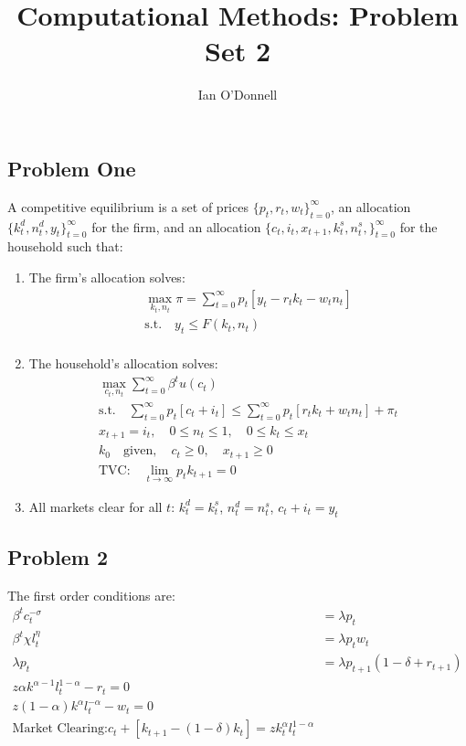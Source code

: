 \documentclass{article}
\title{Computational Methods: Problem Set 2}
\author{Ian O'Donnell}
\date{\vspace{-5ex}}
\begin{document}
\maketitle
\subsection*{Problem One}
A competitive equilibrium is a set of prices $ \{p_t , r_t, w_t\}_{t=0}^\infty $, an allocation $ \{k_t^d, n_t^d, y_t\}_{t=0}^\infty $
for the firm, and an allocation $ \{c_t, i_t, x_{t+1}, k_t^s, n_t^s,\}_{t=0}^\infty $ for the household such that: 
\begin{enumerate}
    \item The firm's allocation solves: 
    \begin{align*}
        \max_{k_t, n_t} \pi = \sum_{t=0}^{\infty} p_t [y_t - r_t k_t - w_t n_t] \\
        \text{s.t.} \quad y_t \leq F(k_t, n_t)\\
    \end{align*}

    \item The household's allocation solves: 
    \begin{gather*}
        \max_{c_t, n_t} \sum_{t=0}^{\infty} \beta^t u(c_t) \\
        \text{s.t.} \quad \sum_{t=0}^{\infty} p_t[c_t + i_t] \leq \sum_{t=0}^{\infty} p_t[r_t k_t + w_t n_t] + \pi _t \\
        x_{t+1} = i_t, \quad 0 \leq n_t \leq 1, \quad 0 \leq k_t \leq x_t \\
        k_0 \quad \text{given}, \quad c_t \geq 0, \quad x_{t+1} \geq 0 \\
        \text{TVC:} \quad \lim_{t \rightarrow \infty} p_t k_{t+1} = 0 
    \end{gather*}

    \item All markets clear for all $t$: $k_t^d = k_t^s$, $n_t^d = n_t^s$, $c_t + i_t = y_t$
\end{enumerate}

\subsection*{Problem 2}
The first order conditions are: 
\begin{align*}
    \beta^t c_t^{-\sigma} &= \lambda p_t \\
    \beta^t \chi l_t^\eta &= \lambda p_t w_t \\
    \lambda p_t &= \lambda p_{t+1} (1 - \delta + r_{t+1})\\
    z \alpha k^{\alpha - 1} l_t^{1-\alpha} - r_t = 0 \\
    z (1 - \alpha) k^{\alpha} l_t^{-\alpha} - w_t = 0 \\
    \text{Market Clearing:} c_t + [k_{t+1} - (1-\delta)k_t] = z k_t^\alpha l_t^{1-\alpha} 
\end{align*}
\end{document}
